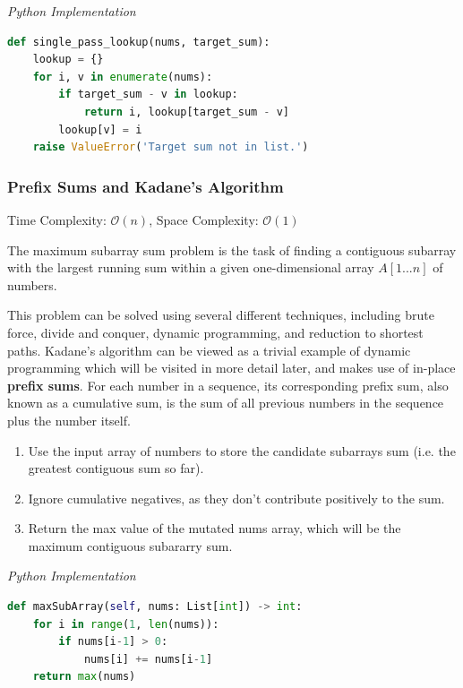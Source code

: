 \documentclass{article}
\newcommand{\bigO}{\mathcal{O}}
\begin{document}
\vspace{8pt} \emph{Python Implementation}
\begin{lstlisting}[language=Python]
def single_pass_lookup(nums, target_sum):
    lookup = {}
    for i, v in enumerate(nums):
        if target_sum - v in lookup:
            return i, lookup[target_sum - v]
        lookup[v] = i
    raise ValueError('Target sum not in list.')
\end{lstlisting}

    \subsubsection{Prefix Sums and Kadane's Algorithm}
    Time Complexity: $\bigO(n)$, Space Complexity: $\bigO(1)$
    
    The maximum subarray sum problem is the task of finding a contiguous subarray with the largest running sum within a given one-dimensional array $A[1...n]$ of numbers.
    
    This problem can be solved using several different techniques, including brute force, divide and conquer, dynamic programming, and reduction to shortest paths. Kadane's algorithm can be viewed as a trivial example of dynamic programming which will be visited in more detail later, and makes use of in-place \textbf{prefix sums}. For each number in a sequence, its corresponding prefix sum, also known as a cumulative sum, is the sum of all previous numbers in the sequence plus the number itself. 
    
    \begin{enumerate}
        \item Use the input array of numbers to store the candidate subarrays sum (i.e. the greatest contiguous sum so far).
        \item Ignore cumulative negatives, as they don't contribute positively to the sum.
        \item Return the max value of the mutated nums array, which will be the maximum contiguous subararry sum.
    \end{enumerate} 
    
\vspace{8pt} \emph{Python Implementation}
\begin{lstlisting}[language=Python]
def maxSubArray(self, nums: List[int]) -> int:
    for i in range(1, len(nums)):
        if nums[i-1] > 0:
            nums[i] += nums[i-1]
    return max(nums)
\end{lstlisting}
\end{document}
